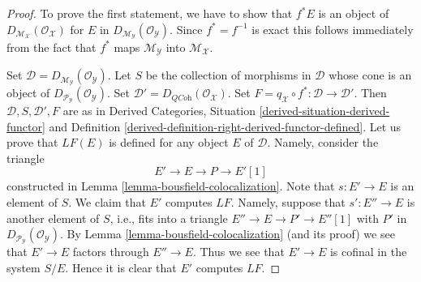 \begin{proof}
To prove the first statement, we have to show that $f^*E$ is an object of
$D_{\mathcal{M}_\mathcal{X}}(\mathcal{O}_\mathcal{X})$ for
$E$ in $D_{\mathcal{M}_\mathcal{Y}}(\mathcal{O}_\mathcal{Y})$.
Since $f^* = f^{-1}$ is exact this follows immediately from the fact that
$f^*$ maps $\mathcal{M}_\mathcal{Y}$ into $\mathcal{M}_\mathcal{X}$.

\medskip\noindent
Set $\mathcal{D} = D_{\mathcal{M}_\mathcal{Y}}(\mathcal{O}_\mathcal{Y})$.
Let $S$ be the collection of morphisms in $\mathcal{D}$
whose cone is an object of
$D_{\mathcal{P}_\mathcal{Y}}(\mathcal{O}_\mathcal{Y})$.
Set $\mathcal{D}' = D_{\textit{QCoh}}(\mathcal{O}_\mathcal{X})$.
Set $F = q_\mathcal{X} \circ f^* : \mathcal{D} \to \mathcal{D}'$.
Then $\mathcal{D}, S, \mathcal{D}', F$ are as in
Derived Categories, Situation \ref{derived-situation-derived-functor} and
Definition \ref{derived-definition-right-derived-functor-defined}.
Let us prove that $LF(E)$ is defined for any object $E$ of $\mathcal{D}$.
Namely, consider the triangle
$$
E' \to E \to P \to E'[1]
$$
constructed in Lemma \ref{lemma-bousfield-colocalization}.
Note that $s : E' \to E$ is an element of $S$. We claim that $E'$ computes
$LF$. Namely, suppose that $s' : E'' \to E$ is another element of $S$, i.e.,
fits into a triangle $E'' \to E \to P' \to E''[1]$ with $P'$ in
$D_{\mathcal{P}_\mathcal{Y}}(\mathcal{O}_\mathcal{Y})$. By
Lemma \ref{lemma-bousfield-colocalization} (and its proof)
we see that $E' \to E$ factors through $E'' \to E$. Thus we see that
$E' \to E$ is cofinal in the system $S/E$. Hence it is clear that
$E'$ computes $LF$.


\end{proof}
